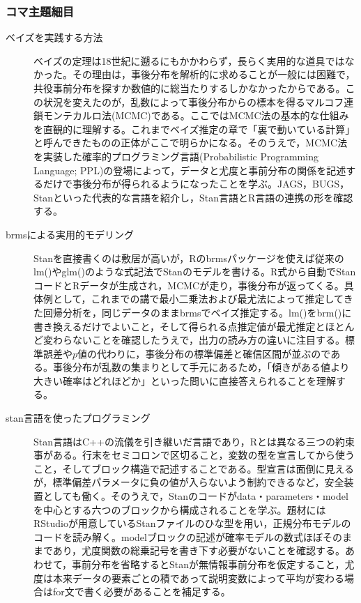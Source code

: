 \subsubsection{コマ主題細目}
\begin{description}
	\item[ベイズを実践する方法] ベイズの定理は18世紀に遡るにもかかわらず，長らく実用的な道具ではなかった。その理由は，事後分布を解析的に求めることが一般には困難で，共役事前分布を探すか数値的に総当たりするしかなかったからである。この状況を変えたのが，乱数によって事後分布からの標本を得るマルコフ連鎖モンテカルロ法(MCMC)である。ここではMCMC法の基本的な仕組みを直観的に理解する。これまでベイズ推定の章で「裏で動いている計算」と呼んできたものの正体がここで明らかになる。そのうえで，MCMC法を実装した確率的プログラミング言語(Probabilistic Programming Language; PPL)の登場によって，データと尤度と事前分布の関係を記述するだけで事後分布が得られるようになったことを学ぶ。JAGS，BUGS，Stanといった代表的な言語を紹介し，Stan言語とR言語の連携の形を確認する。

	\item[brmsによる実用的モデリング] Stanを直接書くのは敷居が高いが，Rのbrmsパッケージを使えば従来のlm()やglm()のような式記法でStanのモデルを書ける。R式から自動でStanコードとRデータが生成され，MCMCが走り，事後分布が返ってくる。具体例として，これまでの講で最小二乗法および最尤法によって推定してきた回帰分析を，同じデータのままbrmsでベイズ推定する。lm()をbrm()に書き換えるだけでよいこと，そして得られる点推定値が最尤推定とほとんど変わらないことを確認したうえで，出力の読み方の違いに注目する。標準誤差や$p$値の代わりに，事後分布の標準偏差と確信区間が並ぶのである。事後分布が乱数の集まりとして手元にあるため，「傾きがある値より大きい確率はどれほどか」といった問いに直接答えられることを理解する。

	\item[stan言語を使ったプログラミング] Stan言語はC++の流儀を引き継いだ言語であり，Rとは異なる三つの約束事がある。行末をセミコロンで区切ること，変数の型を宣言してから使うこと，そしてブロック構造で記述することである。型宣言は面倒に見えるが，標準偏差パラメータに負の値が入らないよう制約できるなど，安全装置としても働く。そのうえで，Stanのコードがdata・parameters・modelを中心とする六つのブロックから構成されることを学ぶ。題材にはRStudioが用意しているStanファイルのひな型を用い，正規分布モデルのコードを読み解く。modelブロックの記述が確率モデルの数式ほぼそのままであり，尤度関数の総乗記号を書き下す必要がないことを確認する。あわせて，事前分布を省略するとStanが無情報事前分布を仮定すること，尤度は本来データの要素ごとの積であって説明変数によって平均が変わる場合はfor文で書く必要があることを補足する。


\end{description}
